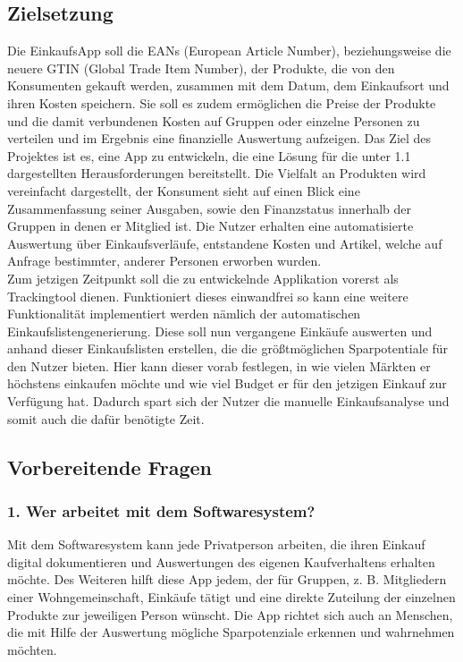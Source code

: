 \documentclass[12pt,a4paper]{article}
\begin{document}
\subsection{Zielsetzung}
Die EinkaufsApp soll die EANs (European Article Number), beziehungsweise die neuere GTIN (Global Trade Item Number), der Produkte, die von den Konsumenten gekauft werden, zusammen mit dem Datum, dem Einkaufsort und ihren Kosten speichern.
Sie soll es zudem ermöglichen die Preise der Produkte und die damit verbundenen Kosten auf Gruppen oder einzelne Personen zu verteilen und im Ergebnis eine finanzielle Auswertung aufzeigen.
Das Ziel des Projektes ist es, eine App zu entwickeln, die eine Lösung für die unter 1.1 dargestellten Herausforderungen bereitstellt. 
Die Vielfalt an Produkten wird vereinfacht dargestellt, der Konsument sieht auf einen Blick eine Zusammenfassung seiner Ausgaben, sowie den Finanzstatus innerhalb der Gruppen in denen er Mitglied ist. Die Nutzer erhalten eine automatisierte Auswertung über Einkaufsverläufe, entstandene Kosten und Artikel, welche auf Anfrage bestimmter, anderer Personen erworben wurden.
\\
Zum jetzigen Zeitpunkt soll die zu entwickelnde Applikation vorerst als Trackingtool dienen. Funktioniert dieses einwandfrei so kann eine weitere Funktionalität implementiert werden nämlich der automatischen Einkaufslistengenerierung. Diese soll nun vergangene Einkäufe auswerten und anhand dieser Einkaufslisten erstellen, die die größtmöglichen Sparpotentiale für den Nutzer bieten. Hier kann dieser vorab festlegen, in wie vielen Märkten er höchstens einkaufen möchte und wie viel Budget er für den jetzigen Einkauf zur Verfügung hat. Dadurch spart sich der Nutzer die manuelle Einkaufsanalyse und somit auch die dafür benötigte Zeit.

\newpage
\subsection{Vorbereitende Fragen}
\subsubsection*{1. Wer arbeitet mit dem Softwaresystem?}
Mit dem Softwaresystem kann jede Privatperson arbeiten, die ihren Einkauf digital dokumentieren und Auswertungen des eigenen Kaufverhaltens erhalten möchte. 
Des Weiteren hilft diese App jedem, der für Gruppen, z. B. Mitgliedern einer Wohngemeinschaft, Einkäufe tätigt und eine direkte Zuteilung der einzelnen Produkte zur jeweiligen Person wünscht. 
Die App richtet sich auch an Menschen, die mit Hilfe der Auswertung mögliche Sparpotenziale erkennen und wahrnehmen möchten. 
\\
\\
\end{document}
